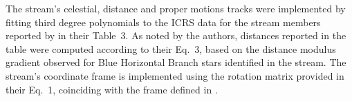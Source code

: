The stream's celestial, distance and proper motions tracks were implemented by fitting third degree polynomials to the ICRS data for the stream members reported by \citet{Ferguson2022} in their Table~3. As noted by the authors, distances reported in the table were computed according to their Eq.~3, based on the distance modulus gradient observed for Blue Horizontal Branch stars identified in the stream. The stream's coordinate frame is implemented using the rotation matrix provided in their Eq.~1, coinciding with the frame defined in \citet{Jethwa2018}.
